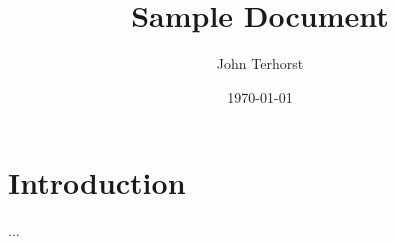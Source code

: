 \documentclass[10pt,cmgr,tagging]{jpt}
\title{Sample Document}
\author{John Terhorst}
\date{\today}
\begin{document}
\maketitle

\section{Introduction}

...
\end{document}
